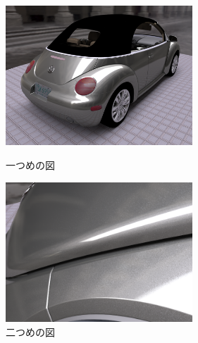 \begin{figure}[htbp]
 \begin{minipage}{0.4\hsize}
  \begin{center}
   \includegraphics[width=70mm]{./img/back_hq.png}
  \end{center}
  \caption{一つめの図}
  \label{fig:one}
 \end{minipage}
 \begin{minipage}{0.75\hsize}
  \begin{center}
    \includegraphics[width=70mm]{./img/sparkles.png}
  \end{center}
  \caption{二つめの図}
  \label{fig:two}
 \end{minipage}
\end{figure}


